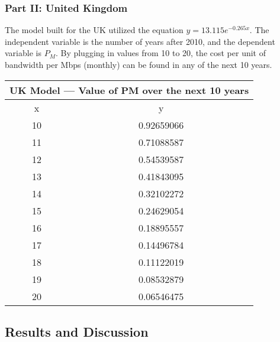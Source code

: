    \subsubsection{Part II: United Kingdom}
    The model built for the UK utilized the equation $y = 13.115e^{-0.265x}$. The independent variable is the number of years after 2010, and the dependent variable is $P_M$. By plugging in values from 10 to 20, the cost per unit of bandwidth per Mbps (monthly) can be found in any of the next 10 years.
    
    \begin{center}
\begin{tabular}{|c|c|}
\hline
\multicolumn{2}{|c|}{UK Model — Value of PM over the next 10 years} \\ \hline
x                            & y                                    \\ \hline
10                           & 0.92659066                           \\ \hline
11                           & 0.71088587                           \\ \hline
12                           & 0.54539587                           \\ \hline
13                           & 0.41843095                           \\ \hline
14                           & 0.32102272                           \\ \hline
15                           & 0.24629054                           \\ \hline
16                           & 0.18895557                           \\ \hline
17                           & 0.14496784                           \\ \hline
18                           & 0.11122019                           \\ \hline
19                           & 0.08532879                           \\ \hline
20                           & 0.06546475                           \\ \hline
\end{tabular}
    \end{center}
    
    

    \subsection{Results and Discussion}
